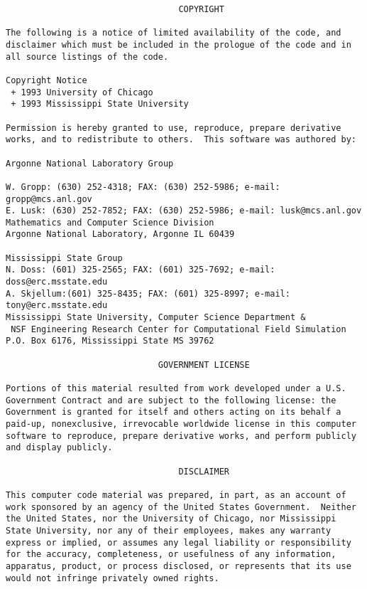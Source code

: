 \begin{verbatim}
                                  COPYRIGHT

The following is a notice of limited availability of the code, and
disclaimer which must be included in the prologue of the code and in
all source listings of the code.

Copyright Notice
 + 1993 University of Chicago
 + 1993 Mississippi State University

Permission is hereby granted to use, reproduce, prepare derivative
works, and to redistribute to others.  This software was authored by:

Argonne National Laboratory Group

W. Gropp: (630) 252-4318; FAX: (630) 252-5986; e-mail:
gropp@mcs.anl.gov
E. Lusk: (630) 252-7852; FAX: (630) 252-5986; e-mail: lusk@mcs.anl.gov
Mathematics and Computer Science Division
Argonne National Laboratory, Argonne IL 60439

Mississippi State Group
N. Doss: (601) 325-2565; FAX: (601) 325-7692; e-mail:
doss@erc.msstate.edu
A. Skjellum:(601) 325-8435; FAX: (601) 325-8997; e-mail:
tony@erc.msstate.edu
Mississippi State University, Computer Science Department &
 NSF Engineering Research Center for Computational Field Simulation
P.O. Box 6176, Mississippi State MS 39762

                              GOVERNMENT LICENSE

Portions of this material resulted from work developed under a U.S.
Government Contract and are subject to the following license: the
Government is granted for itself and others acting on its behalf a
paid-up, nonexclusive, irrevocable worldwide license in this computer
software to reproduce, prepare derivative works, and perform publicly
and display publicly.

                                  DISCLAIMER

This computer code material was prepared, in part, as an account of
work sponsored by an agency of the United States Government.  Neither
the United States, nor the University of Chicago, nor Mississippi
State University, nor any of their employees, makes any warranty
express or implied, or assumes any legal liability or responsibility
for the accuracy, completeness, or usefulness of any information,
apparatus, product, or process disclosed, or represents that its use
would not infringe privately owned rights.
\end{verbatim}
